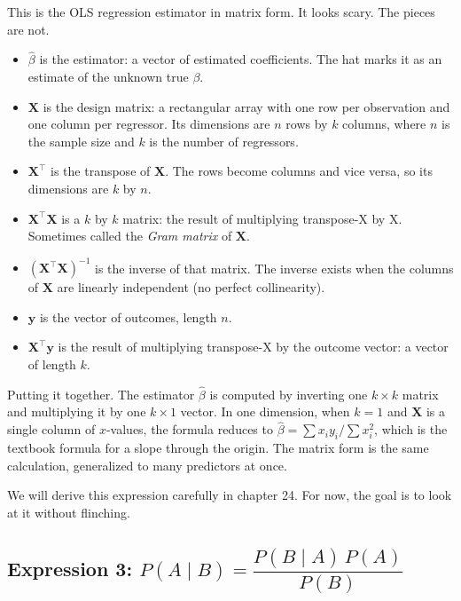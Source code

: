 \documentclass[
  letterpaper,
  11pt,
  twoside,
  openany]{scrbook}
\providecommand{\tightlist}{%
  \setlength{\itemsep}{0pt}\setlength{\parskip}{0pt}}
\begin{document}
This is the OLS regression estimator in matrix form. It looks scary. The
pieces are not.

\begin{itemize}
\tightlist
\item
  \(\hat\beta\) is the estimator: a vector of estimated coefficients.
  The hat marks it as an estimate of the unknown true \(\beta\).
\item
  \(\bm{X}\) is the design matrix: a rectangular array with one row per
  observation and one column per regressor. Its dimensions are \(n\)
  rows by \(k\) columns, where \(n\) is the sample size and \(k\) is the
  number of regressors.
\item
  \(\bm{X}^\top\) is the transpose of \(\bm{X}\). The rows become
  columns and vice versa, so its dimensions are \(k\) by \(n\).
\item
  \(\bm{X}^\top\bm{X}\) is a \(k\) by \(k\) matrix: the result of
  multiplying transpose-X by X. Sometimes called the \emph{Gram matrix}
  of \(\bm{X}\).
\item
  \((\bm{X}^\top\bm{X})^{-1}\) is the inverse of that matrix. The
  inverse exists when the columns of \(\bm{X}\) are linearly independent
  (no perfect collinearity).
\item
  \(\bm{y}\) is the vector of outcomes, length \(n\).
\item
  \(\bm{X}^\top\bm{y}\) is the result of multiplying transpose-X by the
  outcome vector: a vector of length \(k\).
\end{itemize}

Putting it together. The estimator \(\hat\beta\) is computed by
inverting one \(k \times k\) matrix and multiplying it by one
\(k \times 1\) vector. In one dimension, when \(k = 1\) and \(\bm{X}\)
is a single column of \(x\)-values, the formula reduces to
\(\hat\beta = \sum x_i y_i / \sum x_i^2\), which is the textbook formula
for a slope through the origin. The matrix form is the same calculation,
generalized to many predictors at once.

We will derive this expression carefully in chapter 24. For now, the
goal is to look at it without flinching.

\subsection{\texorpdfstring{Expression 3:
\(P(A \mid B) = \dfrac{P(B \mid A) \, P(A)}{P(B)}\)}{Expression 3: P(A \textbackslash mid B) = \textbackslash dfrac\{P(B \textbackslash mid A) \textbackslash, P(A)\}\{P(B)\}}}\label{expression-3-pa-mid-b-dfracpb-mid-a-papb}
\end{document}

